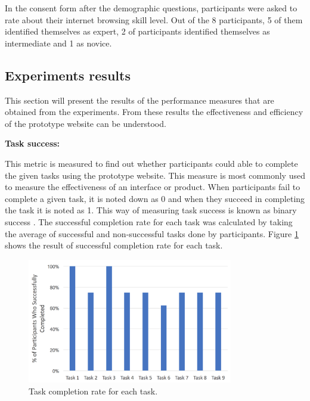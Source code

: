 \documentclass[mscthesis]{usiinfthesis}
\begin{document}
In the consent form after the demographic questions, participants were asked to rate about their internet browsing skill level. Out of the 8 participants, 5 of them identified themselves as expert, 2 of participants identified themselves as intermediate and 1 as novice.

\subsection{Experiments results} 
This section will present the results of the performance measures that are obtained from the experiments. From these results the effectiveness and efficiency of the prototype website can be understood.
\newline

\textbf{Task success:}

This metric is measured to find out whether participants could able to complete the given tasks using the prototype website. This measure is most commonly used to measure the effectiveness of an interface or product. When participants fail to complete a given task, it is noted down as 0 and when they succeed in completing the task it is noted as 1. This way of measuring task success is known as binary success \cite{albert2013measuring}. The successful completion rate for each task was calculated by taking the average of successful and non-successful tasks done by participants. Figure \ref{fig17} shows the result of successful completion rate for each task. 

\begin{figure}[!ht]
  \centering
  \includegraphics[width=0.8\textwidth]{wbTC}
  \caption{Task completion rate for each task.}
  \label{fig17}
\end{figure}
\end{document}
